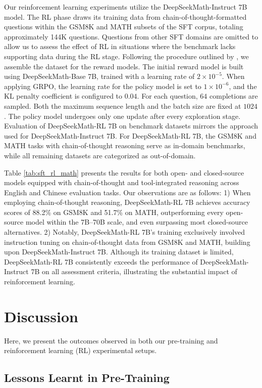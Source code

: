 \begin{itemize}[topsep=0pt]
\begin{itemize}[topsep=0pt]
Our reinforcement learning experiments utilize the DeepSeekMath-Instruct 7B model. The RL phase draws its training data from chain-of-thought-formatted questions within the GSM8K and MATH subsets of the SFT corpus, totaling approximately 144K questions. Questions from other SFT domains are omitted to allow us to assess the effect of RL in situations where the benchmark lacks supporting data during the RL stage. Following the procedure outlined by \citep{wang2023math}, we assemble the dataset for the reward models. The initial reward model is built using DeepSeekMath-Base 7B, trained with a learning rate of $2 \times 10^{-5}$. When applying GRPO, the learning rate for the policy model is set to $1 \times 10^{-6}$, and the KL penalty coefficient is configured to $0.04$. For each question, $64$ completions are sampled. Both the maximum sequence length and the batch size are fixed at $1024$. The policy model undergoes only one update after every exploration stage. Evaluation of DeepSeekMath-RL 7B on benchmark datasets mirrors the approach used for DeepSeekMath-Instruct 7B. For DeepSeekMath-RL 7B, the GSM8K and MATH tasks with chain-of-thought reasoning serve as in-domain benchmarks, while all remaining datasets are categorized as out-of-domain.

Table \ref{tab:sft_rl_math} presents the results for both open- and closed-source models equipped with chain-of-thought and tool-integrated reasoning across English and Chinese evaluation tasks. Our observations are as follows: 1) When employing chain-of-thought reasoning, DeepSeekMath-RL 7B achieves accuracy scores of 88.2\% on GSM8K and 51.7\% on MATH, outperforming every open-source model within the 7B–70B scale, and even surpassing most closed-source alternatives. 2) Notably, DeepSeekMath-RL 7B’s training exclusively involved instruction tuning on chain-of-thought data from GSM8K and MATH, building upon DeepSeekMath-Instruct 7B. Although its training dataset is limited, DeepSeekMath-RL 7B consistently exceeds the performance of DeepSeekMath-Instruct 7B on all assessment criteria, illustrating the substantial impact of reinforcement learning.

\section{Discussion}
Here, we present the outcomes observed in both our pre-training and reinforcement learning (RL) experimental setups.

\subsection{Lessons Learnt in Pre-Training}


\end{itemize}
\end{itemize}
